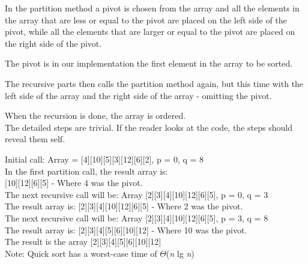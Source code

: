 \documentclass[12pt,a4paper]{article}
\begin{document}
In the partition method a pivot is chosen from the array and all the elements in the array that are less or equal to the pivot are placed on the left side of the pivot, while all the elements that are larger or equal to the pivot are placed on the right side of the pivot.

The pivot is in our implementation the first element in the array to be sorted.

The recursive parts then calls the partition method again, but this time with the left side of the array and the right side of the array - omitting the pivot.

When the recursion is done, the array is ordered.\\

The detailed steps are trivial. If the reader looks at the code, the steps should reveal them self.

\noindent
Initial call: Array = [4][10][5][3][12][6][2], p = 0, q = 8\\
\noindent
In the first partition call, the result array is: \\
\noindent
[2][3]{\color{blue}[4]}[10][12][6][5] - Where 4 was the pivot.\\

\noindent
The next recursive call will be: Array [2][3][4][10][12][6][5], p = 0, q = 3\\
\noindent
The result array is:
{\color{blue}[2]}[3][4][10][12][6][5] - Where 2 was the pivot.\\

\noindent
The next recursive call will be: Array [2][3][4][10][12][6][5], p = 3, q = 8\\
\noindent
The result array is:
[2][3][4][5][6]{\color{blue}[10]}[12] - Where 10 was the pivot.\\



\noindent
The result is the array [2][3][4][5][6][10][12]\\
\noindent
Note: Quick sort has a worst-case time of $\Theta$(\textit{n} lg \textit{n})

\clearpage
\end{document}
